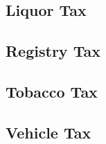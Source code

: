 \documentclass[12pt]{article}
\begin{document}
\begin{appendices}
\subsection{Liquor Tax}
\subsection{Registry Tax}
\subsection{Tobacco Tax}
\subsection{Vehicle Tax}


\end{appendices}






\end{document}
